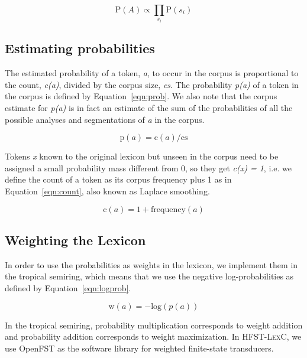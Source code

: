 \documentclass[postprint]{flammie}
\begin{document}
\begin{equation}
  \label{eqn:prodprob}
  \mathrm{P}(A) \propto \prod_{s_i} \mathrm{P}(s_i)
\end{equation}

\subsection{Estimating probabilities}

The estimated probability of a token, \emph{a}, to occur in the corpus
is proportional to the count, \emph{c(a)}, divided by the corpus size,
\emph{cs}. The probability \emph{p(a)} of a token in the corpus is
defined by Equation~\ref{eqn:prob}. We also note that the corpus
estimate for \emph{p(a)} is in fact an estimate of the sum of the
probabilities of all the possible analyses and segmentations of
\emph{a} in the corpus.

\begin{equation}
  \label{eqn:prob}
  \mathrm{p}(a) = \mathrm{c}(a)/\mathrm{cs}
\end{equation}

Tokens \emph{x} known to the original lexicon but unseen in the corpus
need to be assigned a small probability mass different from 0, so they
get \emph{c(x) = 1}, i.e. we define the count of a token as its corpus
frequency plus 1 as in Equation~\ref{eqn:count}, also known as Laplace
smoothing.

\begin{equation}
  \label{eqn:count}
  \mathrm{c}(a) = 1 + \mathrm{frequency}(a)
\end{equation}

\subsection{Weighting the Lexicon}

In order to use the probabilities as weights in the lexicon, we
implement them in the tropical semiring, which means that we use the
negative log-probabilities as defined by Equation~\ref{eqn:logprob}.

\begin{equation}
  \label{eqn:logprob}
  \mathrm{w}(a) = -\mathrm{log}(p(a))
\end{equation}

In the tropical semiring, probability multiplication corresponds to
weight addition and probability addition corresponds to weight
maximization. In \textsc{HFST-LexC}, we use OpenFST \cite{openfst} as
the software library for weighted finite-state transducers.
\end{document}

